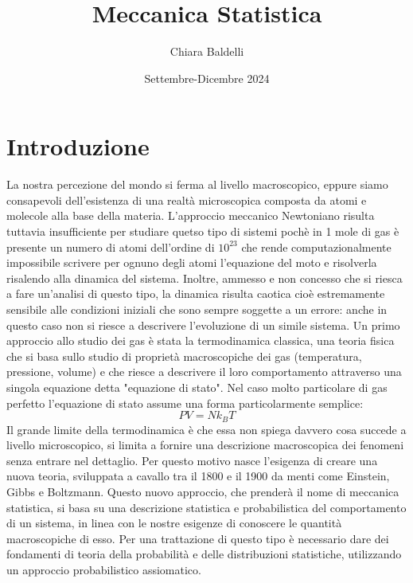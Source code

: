 \documentclass{article}
\title{Meccanica Statistica}
\author{Chiara Baldelli}
\date{Settembre-Dicembre 2024}
\begin{document}
\maketitle

\section{Introduzione}
La nostra percezione del mondo si ferma al livello macroscopico, eppure siamo consapevoli dell'esistenza di una realtà microscopica composta da atomi e molecole alla base della materia. L'approccio meccanico Newtoniano risulta tuttavia insufficiente per studiare quetso tipo di sistemi pochè in 1 mole di gas è presente un numero di atomi dell'ordine di $10^23$ che rende computazionalmente impossibile scrivere per ognuno degli atomi l'equazione del moto e risolverla risalendo alla dinamica del sistema. Inoltre, ammesso e non concesso che si riesca a fare un'analisi di questo tipo, la dinamica risulta caotica cioè estremamente sensibile alle condizioni iniziali che sono sempre soggette a un errore: anche in questo caso non si riesce a descrivere l'evoluzione di un simile sistema. Un primo approccio allo studio dei gas è stata la termodinamica classica, una teoria fisica che si basa sullo studio di proprietà macroscopiche dei gas (temperatura, pressione, volume) e che riesce a descrivere il loro comportamento attraverso una singola equazione detta "equazione di stato". Nel caso molto particolare di gas perfetto l'equazione di stato assume una forma particolarmente semplice:
\begin{equation*}
    PV=Nk_BT
\end{equation*}
Il grande limite della termodinamica è che essa non spiega davvero cosa succede a livello microscopico, si limita a fornire una descrizione macroscopica dei fenomeni senza entrare nel dettaglio. Per questo motivo nasce l'esigenza di creare una nuova teoria, sviluppata a cavallo tra il 1800 e il 1900 da menti come Einstein, Gibbs e Boltzmann. Questo nuovo approccio, che prenderà il nome di meccanica statistica, si basa su una descrizione statistica e probabilistica del comportamento di un sistema, in linea con le nostre esigenze di conoscere le quantità macroscopiche di esso. Per una trattazione di questo tipo è necessario dare dei fondamenti di teoria della probabilità e delle distribuzioni statistiche, utilizzando un approccio probabilistico assiomatico.
\end{document}
